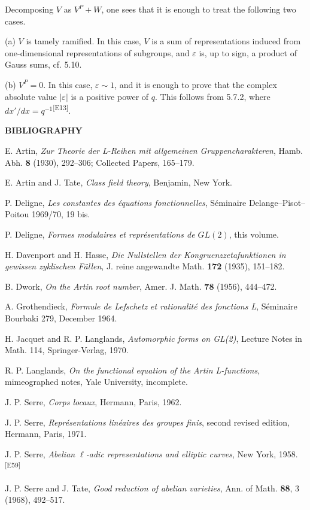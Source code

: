 \documentclass[10pt,letterpaper]{article}
\newcommand{\auditmark}[1]{\textsuperscript{\normalfont\scriptsize[E#1]}}
\begin{document}
Decomposing \(V\) as \(V^P+W\), one sees that it is enough to treat the following two cases.

(a) \(V\) is tamely ramified. In this case, \(V\) is a sum of representations induced from one-dimensional representations of subgroups, and \(\varepsilon\) is, up to sign, a product of Gauss sums, cf. 5.10.

(b) \(V^P=0\). In this case, \(\varepsilon\sim1\), and it is enough to prove that the complex absolute value \(|\varepsilon|\) is a positive power of \(q\). This follows from 5.7.2, where \(dx'/dx=q^{-1}\)\auditmark{13}.


\begin{center}
\bfseries BIBLIOGRAPHY
\end{center}

\begin{enumerate}[label={[\arabic*]},leftmargin=2.8em]
\item E. Artin, \emph{Zur Theorie der L-Reihen mit allgemeinen Gruppencharakteren}, Hamb. Abh. \textbf{8} (1930), 292--306; Collected Papers, 165--179.
\item E. Artin and J. Tate, \emph{Class field theory}, Benjamin, New York.
\item P. Deligne, \emph{Les constantes des équations fonctionnelles}, Séminaire Delange--Pisot--Poitou 1969/70, 19 bis.
\item P. Deligne, \emph{Formes modulaires et représentations de \(GL(2)\)}, this volume.
\item H. Davenport and H. Hasse, \emph{Die Nullstellen der Kongruenzzetafunktionen in gewissen zyklischen Fällen}, J. reine angewandte Math. \textbf{172} (1935), 151--182.
\item B. Dwork, \emph{On the Artin root number}, Amer. J. Math. \textbf{78} (1956), 444--472.
\item A. Grothendieck, \emph{Formule de Lefschetz et rationalité des fonctions L}, Séminaire Bourbaki 279, December 1964.
\item H. Jacquet and R. P. Langlands, \emph{Automorphic forms on GL(2)}, Lecture Notes in Math. 114, Springer-Verlag, 1970.
\item R. P. Langlands, \emph{On the functional equation of the Artin L-functions}, mimeographed notes, Yale University, incomplete.
\item J. P. Serre, \emph{Corps locaux}, Hermann, Paris, 1962.
\item J. P. Serre, \emph{Représentations linéaires des groupes finis}, second revised edition, Hermann, Paris, 1971.
\item J. P. Serre, \emph{Abelian \(\ell\)-adic representations and elliptic curves}, New York, 1958.\auditmark{59}
\item J. P. Serre and J. Tate, \emph{Good reduction of abelian varieties}, Ann. of Math. \textbf{88}, 3 (1968), 492--517.


\end{enumerate}
\end{document}
